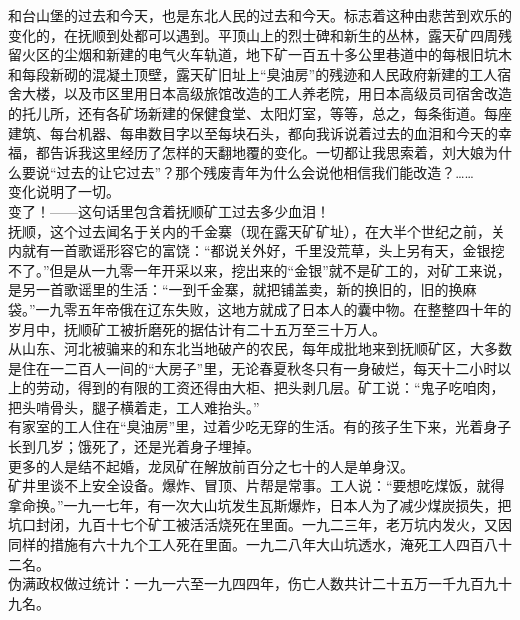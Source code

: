 和台山堡的过去和今天，也是东北人民的过去和今天。标志着这种由悲苦到欢乐的变化的，在抚顺到处都可以遇到。平顶山上的烈士碑和新生的丛林，露天矿四周残留火区的尘烟和新建的电气火车轨道，地下矿一百五十多公里巷道中的每根旧坑木和每段新砌的混凝土顶壁，露天矿旧址上“臭油房”的残迹和人民政府新建的工人宿舍大楼，以及市区里用日本高级旅馆改造的工人养老院，用日本高级员司宿舍改造的托儿所，还有各矿场新建的保健食堂、太阳灯室，等等，总之，每条街道。每座建筑、每台机器、每串数目字以至每块石头，都向我诉说着过去的血泪和今天的幸福，都告诉我这里经历了怎样的天翻地覆的变化。一切都让我思索着，刘大娘为什么要说“过去的让它过去”？那个残废青年为什么会说他相信我们能改造？……\\

变化说明了一切。\\

变了！——这句话里包含着抚顺矿工过去多少血泪！\\

抚顺，这个过去闻名于关内的千金寨（现在露天矿矿址），在大半个世纪之前，关内就有一首歌谣形容它的富饶：“都说关外好，千里没荒草，头上另有天，金银挖不了。”但是从一九零一年开采以来，挖出来的“金银”就不是矿工的，对矿工来说，是另一首歌谣里的生活：“一到千金寨，就把铺盖卖，新的换旧的，旧的换麻袋。”一九零五年帝俄在辽东失败，这地方就成了日本人的囊中物。在整整四十年的岁月中，抚顺矿工被折磨死的据估计有二十五万至三十万人。\\

从山东、河北被骗来的和东北当地破产的农民，每年成批地来到抚顺矿区，大多数是住在一二百人一间的“大房子”里，无论春夏秋冬只有一身破烂，每天十二小时以上的劳动，得到的有限的工资还得由大柜、把头剥几层。矿工说：“鬼子吃咱肉，把头啃骨头，腿子横着走，工人难抬头。”\\

有家室的工人住在“臭油房”里，过着少吃无穿的生活。有的孩子生下来，光着身子长到几岁；饿死了，还是光着身子埋掉。\\

更多的人是结不起婚，龙凤矿在解放前百分之七十的人是单身汉。\\

矿井里谈不上安全设备。爆炸、冒顶、片帮是常事。工人说：“要想吃煤饭，就得拿命换。”一九一七年，有一次大山坑发生瓦斯爆炸，日本人为了减少煤炭损失，把坑口封闭，九百十七个矿工被活活烧死在里面。一九二三年，老万坑内发火，又因同样的措施有六十九个工人死在里面。一九二八年大山坑透水，淹死工人四百八十二名。\\

伪满政权做过统计：一九一六至一九四四年，伤亡人数共计二十五万一千九百九十九名。\\

